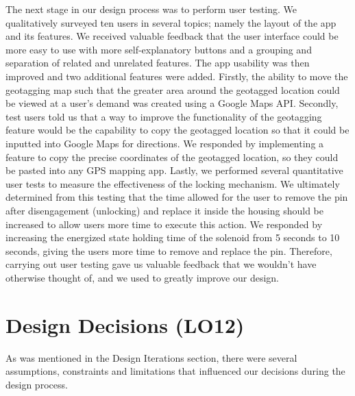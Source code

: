 \documentclass{article}
\begin{document}
The next stage in our design process was to perform user testing. We qualitatively surveyed ten users in several topics; namely the layout of the app and its features. We received valuable feedback that the user interface could be more easy to use with more self-explanatory buttons and a grouping and separation of related and unrelated features. The app usability was then improved and two additional features were added. Firstly, the ability to move the geotagging map such that the greater area around the geotagged location could be viewed at a user's demand was created using a Google Maps API. Secondly, test users told us that a way to improve the functionality of the geotagging feature would be the capability to copy the geotagged location so that it could be inputted into Google Maps for directions. We responded by implementing a feature to copy the precise coordinates of the geotagged location, so they could be pasted into any GPS mapping app. Lastly, we performed several quantitative user tests to measure the effectiveness of the locking mechanism. We ultimately determined from this testing that the time allowed for the user to remove the pin after disengagement (unlocking) and replace it inside the housing should be increased to allow users more time to execute this action. We responded by increasing the energized state holding time of the solenoid from 5 seconds to 10 seconds, giving the users more time to remove and replace the pin. Therefore, carrying out user testing gave us valuable feedback that we wouldn't have otherwise thought of, and we used to greatly improve our design.



\section{Design Decisions (LO12)}

 As was mentioned in the Design Iterations section, there were several assumptions, constraints and limitations that influenced our decisions during the design process. 
\end{document}
